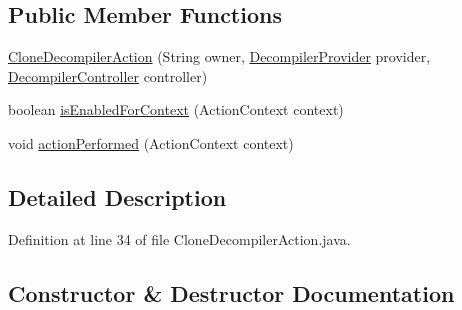 \subsection*{Public Member Functions}
\begin{DoxyCompactItemize}
\item 
\mbox{\hyperlink{classghidra_1_1app_1_1plugin_1_1core_1_1decompile_1_1actions_1_1_clone_decompiler_action_ac9a0130ca26411aab5521a492f5444d3}{Clone\+Decompiler\+Action}} (String owner, \mbox{\hyperlink{classghidra_1_1app_1_1plugin_1_1core_1_1decompile_1_1_decompiler_provider}{Decompiler\+Provider}} provider, \mbox{\hyperlink{classghidra_1_1app_1_1decompiler_1_1component_1_1_decompiler_controller}{Decompiler\+Controller}} controller)
\item 
boolean \mbox{\hyperlink{classghidra_1_1app_1_1plugin_1_1core_1_1decompile_1_1actions_1_1_clone_decompiler_action_a71515c218c910412ba3e6ffe04db5df9}{is\+Enabled\+For\+Context}} (Action\+Context context)
\item 
void \mbox{\hyperlink{classghidra_1_1app_1_1plugin_1_1core_1_1decompile_1_1actions_1_1_clone_decompiler_action_ac35526e35fa9299322a15ad33eeba884}{action\+Performed}} (Action\+Context context)
\end{DoxyCompactItemize}


\subsection{Detailed Description}


Definition at line 34 of file Clone\+Decompiler\+Action.\+java.



\subsection{Constructor \& Destructor Documentation}
\mbox{\label{classghidra_1_1app_1_1plugin_1_1core_1_1decompile_1_1actions_1_1_clone_decompiler_action_ac9a0130ca26411aab5521a492f5444d3}} 
